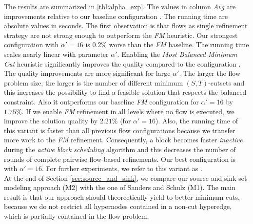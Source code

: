 The results are summarized in \autoref{tbl:alpha_exp}. The values
in column \emph{Avg} are improvements
relative to our baseline configuration \FlowVariant{-}{-}{+}. The running
time are absolute values in seconds. The first observation is that flows
as single refinement strategy are not strong enough to outperform the
\emph{FM} heuristic. Our strongest configuration with $\alpha' = 16$
is $0.2\%$ worse than the \emph{FM} baseline. The running time
scales nearly linear with parameter $\alpha'$. 
Enabling the \emph{Most Balanced Minimum Cut} heuristic significantly improves the
quality compared to the configuration \FlowVariant{+}{-}{-}.
The quality improvements are more significant for large
$\alpha'$. The larger the flow problem size, the larger is the number of different minimum 
$(S,T)$-cutsets and this increases the possibility to find a feasible solution that respects the 
balanced constraint. Also it outperforms our baseline \emph{FM} 
configuration for $\alpha' = 16$ by $1.75\%$.
If we enable \emph{FM} refinement in all levels where no flow is executed, we improve the solution
quality by $2.21\%$ (for $\alpha' = 16$). Also, the running time of this variant is faster
than all previous flow configurations because we transfer more work to the \emph{FM} refinement.
Consequently, a block becomes faster \emph{inactive} during the \emph{active block 
scheduling} algorithm and this decreases the number of rounds of complete pairwise 
flow-based refinements. 
Our best configuration is \FlowVariant{+}{+}{+} with $\alpha' = 16$. 
For further experiments, we refer to this variant as . \\
At the end of Section \ref{sec:source_and_sink}, we compare our source and sink set modeling
approach (\textsc{M2}) with the one of Sanders and Schulz \cite{sanders2011engineering} (\textsc{M1}). The main result is
that our approach should theorectically yield to better minimum cuts, because we do not restrict
all hypernodes contained in a non-cut hyperedge, which is partially contained in the flow problem,
